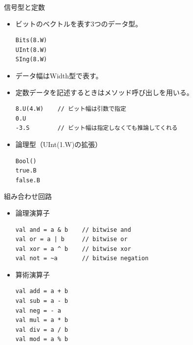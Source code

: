 \begin{frame}[fragile]{信号型と定数}
    \begin{itemize}
        \item ビットのベクトルを表す3つのデータ型。
            \begin{lstlisting}
Bits(8.W)
UInt(8.W)
SIng(8.W)
            \end{lstlisting}
        \item データ幅はWidth型で表す。
        \item 定数データを記述するときはメソッド呼び出しを用いる。
            \begin{lstlisting}
8.U(4.W)    // ビット幅は引数で指定
0.U
-3.S        // ビット幅は指定しなくても推論してくれる
            \end{lstlisting}
        \item 論理型（UInt(1.W)の拡張）
            \begin{lstlisting}
Bool()
true.B
false.B
            \end{lstlisting}
    \end{itemize} 
\end{frame}


\begin{frame}[fragile]{組み合わせ回路}
   \begin{itemize}
       \item 論理演算子
       \begin{lstlisting}
val and = a & b    // bitwise and
val or = a | b     // bitwise or
val xor = a ^ b    // bitwise xor
val not = ~a       // bitwise negation
       \end{lstlisting}
       
       \item 算術演算子
       \begin{lstlisting}
val add = a + b
val sub = a - b
val neg = - a
val mul = a * b
val div = a / b
val mod = a % b
       \end{lstlisting}
   \end{itemize} 
\end{frame}



